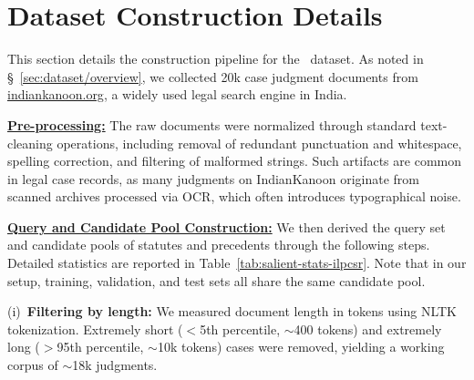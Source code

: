 
\section{Dataset Construction Details}
\label{sec:dataset-appendix}

This section details the construction pipeline for the \ilpcsr\ dataset. As noted in \S~\ref{sec:dataset/overview}, we collected 20k case judgment documents from \url{indiankanoon.org}, a widely used legal search engine in India.  

\vspace{1mm}
\noindent\underline{\textbf{Pre-processing:}} The raw documents were normalized through standard text-cleaning operations, including removal of redundant punctuation and whitespace, spelling correction, and filtering of malformed strings. Such artifacts are common in legal case records, as many judgments on IndianKanoon originate from scanned archives processed via OCR, which often introduces typographical noise.  

\vspace{1mm}
\noindent\underline{\textbf{Query and Candidate Pool Construction:}} We then derived the query set and candidate pools of statutes and precedents through the following steps. Detailed statistics are reported in Table~\ref{tab:salient-stats-ilpcsr}. Note that in our setup, training, validation, and test sets all share the same candidate pool.  

\noindent (i)~\textbf{Filtering by length:} We measured document length in tokens using NLTK~\citep{loper2002nltk} tokenization. Extremely short ($<$5th percentile, $\sim$400 tokens) and extremely long ($>$95th percentile, $\sim$10k tokens) cases were removed, yielding a working corpus of $\sim$18k judgments.  

